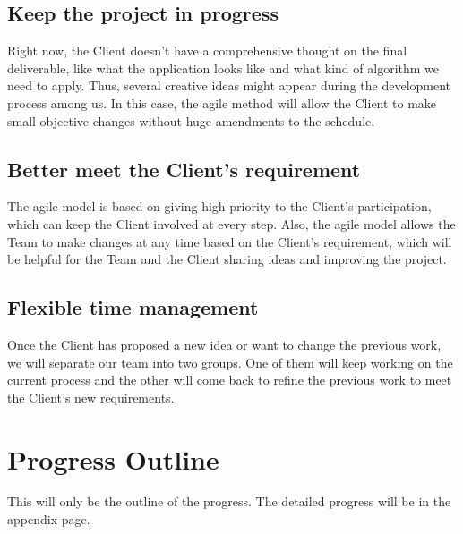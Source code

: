 \documentclass{article}
\begin{document}
\subsection{Keep the project in progress}
Right now, the Client doesn’t have a comprehensive thought on the final deliverable, like what the application looks like and what kind of algorithm we need to apply.  Thus, several creative ideas might appear during the development process among us.  In this case, the agile method will allow the Client to make small objective changes without huge amendments to the schedule. 

\subsection{Better meet the Client’s requirement}
The agile model is based on giving high priority to the Client’s participation, which can keep the Client involved at every step. Also, the agile model allows the Team to make changes at any time based on the Client’s requirement, which will be helpful for the Team and the Client sharing ideas and improving the project. 

\subsection{Flexible time management}
Once the Client has proposed a new idea or want to change the previous work, we will separate our team into two groups. One of them will keep working on the current process and the other will come back to refine the previous work to meet the Client’s new requirements. 

\section{Progress Outline}
This will only be the outline of the progress. The detailed progress will be in the appendix page.
\end{document}
